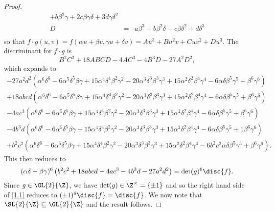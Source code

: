 \documentclass[10pt]{amsart}
\begin{document}
\begin{thm}
\begin{proof}
\begin{eqnarray*}
        + b \beta^{2} \gamma 
        + 2 c \beta \gamma \delta
        + 3 d \gamma \delta^{2}\\
    D &=& a \beta^{3} 
        + b \beta^{2} \delta 
        + c \beta \delta^{2} 
        + d \delta^{3}\\
  \end{eqnarray*}
  so that $f \cdot g(u,v) = f(\alpha u + \beta v, \gamma u + \delta v) = Au^3 + Bu^2v + Cuv^2 + Du^3$.
  The discriminant for $f \cdot g$ is
  $$B^2C^2 + 18ABCD - 4AC^3 - 4B^3D - 27A^2D^2,$$ 
  which expands to
  \begin{eqnarray*}
    - 27 a^{2} d^{2}\left(\alpha^{6} \delta^{6} 
    - 6 \alpha^{5}\delta^{5} \beta\gamma 
    + 15 \alpha^{4}\delta^{4} \beta^{2}\gamma^{2} 
    - 20 \alpha^{3}\delta^{3} \beta^{3}\gamma^{3} 
    + 15 \alpha^{2}\delta^{2} \beta^{4}\gamma^{4} 
    - 6 \alpha\delta \beta^{5}\gamma^{5} 
    + \beta^{6} \gamma^{6}\right)\\
    + 18a b c d \left( \alpha^{6} \delta^{6} 
    - 6 \alpha^{5}\delta^{5} \beta\gamma 
    + 15 \alpha^{4}\delta^{4} \beta^{2}\gamma^{2} 
    - 20 \alpha^{3}\delta^{3} \beta^{3}\gamma^{3} 
    + 15 \alpha^{2}\delta^{2} \beta^{4}\gamma^{4} 
    - 6 \alpha\delta \beta^{5}\gamma^{5} 
    + \beta^{6}\gamma^{6}\right)\\
    - 4 a c^{3} \left( \alpha^{6}\delta^{6} 
    - 6 \alpha^{5}\delta^{5} \beta\gamma 
    + 15 \alpha^{4}\delta^{4} \beta^{2}\gamma^{2} 
    - 20 \alpha^{3}\delta^{3} \beta^{3}\gamma^{3} 
    + 15 \alpha^{2}\delta^{2} \beta^{4}\gamma^{4} 
    - 6 \alpha\delta \beta^{5}\gamma^{5} 
    + \beta^{6}\gamma^{6}\right)\\
    - 4b^{3} d \left(\alpha^{6} \delta^{6} 
    - 6 \alpha^{5}\delta^{5} \beta\gamma 
    + 15 \alpha^{4}\delta^{4} \beta^{2}\gamma^{2} 
    - 20 \alpha^{3}\delta^{3} \beta^{3}\gamma^{3} 
    + 15 \alpha^{2}\delta^{2} \beta^{4}\gamma^{4} 
    - 6 \alpha\delta \beta^{5}\gamma^{5} 
    + 1 \beta^{6}\gamma^{6}\right)\\
    + b^{2} c^{2} \left(\alpha^{6}\delta^{6} 
    - 6 \alpha^{5}\delta^{5} \beta\gamma 
    + 15 \alpha^{4}\delta^{4} \beta^{2}\gamma^{2} 
    - 20 \alpha^{3}\delta^{3} \beta^{3}\gamma^{3} 
    + 15 \alpha^{2}\delta^{2} \beta^{4}\gamma^{4} 
    - 6 b^{2} c^{2}\alpha\delta \beta^{5}\gamma^{5} 
    + \beta^{6} \gamma^{6}\right).
  \end{eqnarray*}
  This then reduces to 
  \begin{equation}\label{1.1}
    (\alpha\delta - \beta\gamma)^6 \left(b^{2}c^{2} + 18abcd - 4 ac^{3} - 4b^{3}d - 27 a^2 d^2 \right) = \det(g)^6\disc{f}.
  \end{equation}
  Since $g \in \GL{2}{\Z}$, we have $\det(g) \in \Z^\times = \{\pm 1\}$ and so the right hand side of \eqref{1.1} reduces to $(\pm 1)^6\disc{f} = \disc{f}$.
  We now note that $\SL{2}{\Z} \subseteq \GL{2}{\Z}$ and the result follows.
  \end{proof}
\end{thm}
\end{document}
